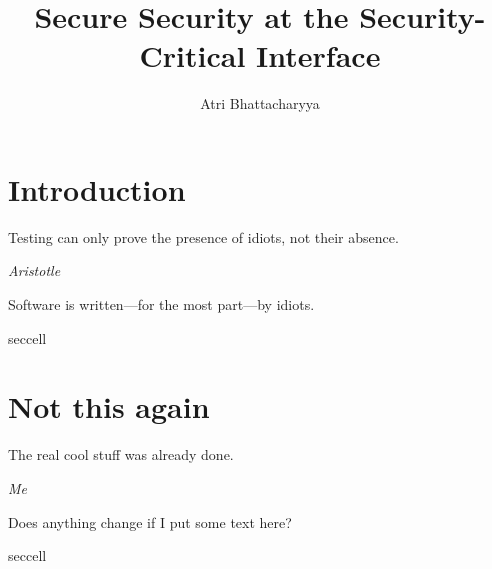 \documentclass[lablogo]{thesis}
\title{Secure Security at the Security-Critical Interface}
\author{Atri Bhattacharyya}
\begin{document}
\chapter{Introduction}
\epigraph{Testing can only prove the presence of idiots, not their absence.}%
         {\textit{Aristotle}}
Software is written---for the most part---by idiots.


\begin{namedscope}{seccell}
\chapter{Not this again}
\label{ch:seccell}
\epigraph{The real cool stuff was already done.}%
        {\textit{Me}}

Does anything change if I put some text here?



\end{namedscope}

\appendices

\begin{namedscope}{seccell}

\end{namedscope}


\backmatter


{}

\end{document}
